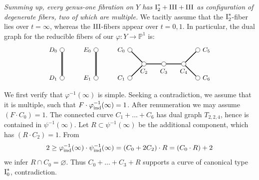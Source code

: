 \documentclass[oneside, 12pt]{amsart}
\theoremstyle{definition}
\theoremstyle{remark}
\newcommand{\PP}{\mathbb{P}}
\newcommand{\I}{\text{\rm I}}
\newcommand{\III}{\text{\rm III}}
\newcommand{\ra}{\rightarrow}
\newcommand{\ind}{\text{\rm ind}}
\begin{document}
\emph{ Summing up, every  genus-one fibration on $Y$ 
 has   $\I_2^*+\III+\III$ as configuration of degenerate fibers, two of which are multiple.}
We tacitly assume that  the $\I_2^*$-fiber lies over $t=\infty$, whereas the
$\III$-fibers appear over $t=0,1$. 
In particular,  the  dual graph for the reducible fibers of our $\varphi:Y\ra\PP^1$ is:
\begin{equation*}
\begin{gathered}
\begin{tikzpicture}
[node distance=1cm, font=\small]
\tikzstyle{vertex}=[circle, draw, fill=white, inner sep=0mm, minimum size=1.5ex]
\node[vertex]	(C2)  	at (1,0) [			label=below:{$C_2$}]	{};
\node[vertex]	(C3)	[right of=C2, 		label=below:{$C_3$}]	{};
\node[vertex]	(C4)	[right of=C3, 		label=below:{$C_4$}]	{};
\node[vertex]	(C5)	[above right of=C4, label=right:{$C_5$}]	{};
\node[vertex]	(C6)	[below right of=C4, label=right:{$C_6$}]	{};
\node[vertex]	(C0)	[above left of=C2, 	label=left :{$C_0$}]	{};
\node[vertex]	(C1)	[below left of=C2, 	label=left :{$C_1$}]	{};

\node[vertex]	(E0)			[left  of=C0, xshift=-2em, label=left :{$E_0$}]	{};
\node[vertex]	(E1)			[left  of=C1, xshift=-2em, label=left :{$E_1$}]	{};
\node[vertex]	(D0)			[left  of=E0, xshift=-2em, label=left :{$D_0$}]	{};
\node[vertex]	(D1)			[left  of=E1, xshift=-2em, label=left :{$D_1$}]	{};


\draw [thick] (C2)--(C3)--(C4);
\draw [thick] (C0)--(C2)--(C1);
\draw [thick] (C6)--(C4)--(C5);
\draw [thick,double] (D0)--(D1);
\draw [thick,double] (E0)--(E1);

\draw [thick] (C2)--(C3)--(C4);
\draw [thick] (C0)--(C2)--(C1);
\draw [thick] (C6)--(C4)--(C5);
\end{tikzpicture}
\end{gathered}
\end{equation*}
We first verify that $\varphi^{-1}(\infty)$ is simple. Seeking a contradiction, we assume that it is multiple,
such that $F\cdot \varphi^{-1}_\ind(\infty)=1$. After renumeration  we may assume $(F\cdot C_0)=1$.
The connected curve $C_1+\ldots+C_6$ has dual graph $T_{2,2,4}$, hence is contained in $\psi^{-1}(\infty)$.
Let $R\subset\psi^{-1}(\infty)$ be the additional component, which has $(R\cdot C_2)=1$.
From
$$
2\geq \varphi^{-1}_\ind(\infty)\cdot \psi^{-1}_\ind(\infty) = (C_0+2C_2)\cdot R = (C_0\cdot R) + 2
$$
we infer $R\cap C_0=\varnothing$. Thus $C_0+\ldots +C_3+R$ supports a curve of canonical type $\I_0^*$, 
contradiction.
\end{document}
